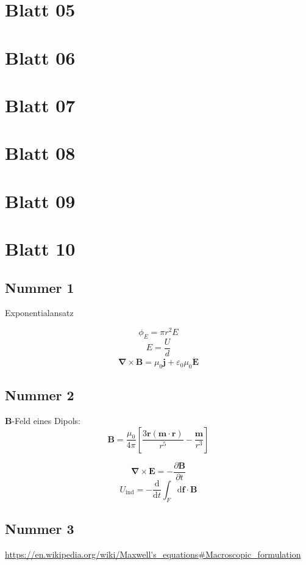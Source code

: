 \documentclass[titlepage,11pt,a4paper,ngerman]{report}
\newcommand{\dd}{\mathrm{d}}
\renewcommand{\vec}[1]{\bm{#1}}
\newcommand{\vepsilon}{\varepsilon}
\begin{document}
\section{Blatt 05}

\section{Blatt 06}

\section{Blatt 07}

\section{Blatt 08}

\section{Blatt 09}


\section{Blatt 10}

\subsection{Nummer 1}

Exponentialansatz

\[\phi_E=\pi r^2 E\]
\[E=\frac{U}{d}\]
\[\vec{\nabla}\times\vec{B}=\mu_0\vec{j}+\vepsilon_0\mu_0\dot{\vec{E}}\]

\subsection{Nummer 2}

$\vec{B}$-Feld eines Dipols:
\[\vec{B}=\frac{\mu_0}{4\pi}\left[\frac{3\vec{r}(\vec{m}\cdot\vec{r})}{r^5}-\frac{\vec{m}}{r^3}\right]\]

\[\vec{\nabla}\times\vec{E}=-\frac{\partial\vec{B}}{\partial t}\]
\[U_\mathrm{ind}=-\frac{\dd}{\dd t}\int_F\dd\vec{f}\cdot\vec{B}\]

\subsection{Nummer 3}

\url{https://en.wikipedia.org/wiki/Maxwell's_equations#Macroscopic_formulation}
\end{document}
